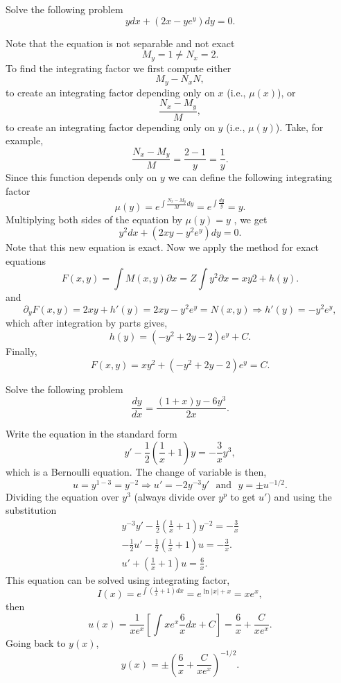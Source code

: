 \documentclass[11pt]{article}
\begin{document}
\begin{problem}
Solve the following problem
\begin{equation*}
ydx + (2x - y e^{y}) dy = 0.
\end{equation*}
\end{problem}
\begin{solution}
Note that the equation is not separable and not exact
\[M _{y} = 1 \neq N_{ x} = 2 .\]
To find the integrating factor we first compute either
\[M_{ y} - N_{ x} N ,\]
to create an integrating factor depending only on $x$ (i.e., $\mu( x )$), or
\[\frac{N_{ x} - M_{ y}}{ M} ,\]
to create an integrating factor depending only on $y$ (i.e., $\mu ( y )$).
Take, for example,
\[\frac{N_{ x} - M_{ y}}{ M} = \frac{2 - 1}{ y} = \frac{1}{y}.\]
Since this function depends only on $y$ we can define the following integrating factor 
\[\mu( y ) = e^{ \int \frac{N_{ x} - M_{ y}}{ M} dy }= e^{ \int \frac{ dy}{ y}} = y.\]
Multiplying both sides of the equation by $\mu ( y ) = y$ , we get
\[y^{ 2} dx + (2 xy - y^{ 2} e^{ y} ) dy = 0 .\]
Note that this new equation is exact.  Now we apply the method for exact equations
\[F ( x,y ) = \int M ( x,y ) \partial x = Z\int y^{ 2} \partial x = xy 2 + h ( y ) .\]
and
\[\partial_{ y} F ( x,y ) = 2 xy + h'( y ) = 2 xy - y^{ 2} e^{ y} = N ( x,y ) \Rightarrow h'( y ) = - y^{ 2} e^{ y} ,\]
which after integration by parts gives,
\[ h ( y ) = ( - y^{ 2} + 2 y - 2) e^{y} +C.\]
Finally,
\[\boxed{F ( x,y ) = xy^{ 2} + ( - y^{ 2} + 2 y - 2) e^{ y} = C }.\]
\end{solution}


\begin{problem}
Solve the following problem
\begin{equation*}
     \frac{dy}{dx}=\frac{(1+x)y-6y^{3}}{2x}.
\end{equation*}
\end{problem}
\begin{solution}
Write the equation in the standard form
\[y'-\frac{1}{2}\left(\frac{1}{x}+1\right)y=-\frac{3}{x}y^{3},\]
which is a Bernoulli equation. The change of variable is then,
\[u = y^{1-3}=y^{-2}\Rightarrow u'=-2 y^{-3}y' \,\,\text{ and }\,\, y = \pm u^{-1/2}.\]
Dividing the equation over $y^{3}$ (always divide over $y^{p}$ to get $u'$) and using the substitution
\begin{gather*}
y^{-3}y'-\frac{1}{2}\left(\frac{1}{x}+1\right)y^{-2}=-\frac{3}{x} \\
-\frac{1}{2}u' - \frac{1}{2} \left(\frac{1}{x}+1\right)u=-\frac{3}{x}. \\
u' + \left(\frac{1}{x}+1\right)u=\frac{6}{x}.
\end{gather*}
This equation can be solved using integrating factor,
\[I(x)=e^{\int\left(\frac{1}{x}+1\right)dx}=e^{\ln|x|+x}=xe^{x},\]
then
\[u(x)= \frac{1}{x e^{x}}\left[\int xe^{x}\frac{6}{x}dx + C\right]= \frac{6}{x}+\frac{C}{xe^{x}}.\]
Going back to $y(x)$,
\[\boxed{y(x)= \pm\left(\frac{6}{x}+\frac{C}{xe^{x}}\right)^{-1/2}}.\]
\end{solution}
\end{document}
